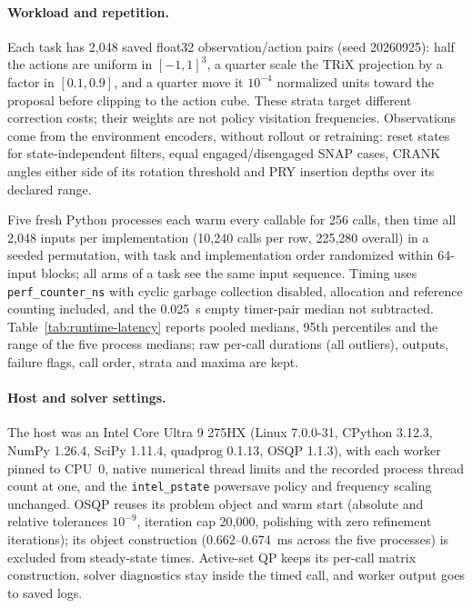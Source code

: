 \documentclass[10pt]{article}
\begin{document}
\paragraph{Workload and repetition.}
Each task has 2,048 saved float32 observation/action pairs (seed 20260925):
half the actions are uniform in $[-1,1]^3$, a quarter scale the TRiX
projection by a factor in $[0.1,0.9]$, and a quarter move it $10^{-4}$
normalized units toward the proposal before clipping to the action cube.
These strata target different correction costs; their weights are not policy
visitation frequencies. Observations come from the environment encoders,
without rollout or retraining: reset states for state-independent filters,
equal engaged/disengaged SNAP cases, CRANK angles either side of its rotation
threshold and PRY insertion depths over its declared range.

Five fresh Python processes each warm every callable for 256 calls, then time
all 2,048 inputs per implementation (10,240 calls per row, 225,280 overall)
in a seeded permutation, with task and implementation order randomized within
64-input blocks; all arms of a task see the same input sequence. Timing uses
\texttt{perf\_counter\_ns} with cyclic garbage collection disabled, allocation
and reference counting included, and the 0.025~\textmu s empty timer-pair median
not subtracted. Table~\ref{tab:runtime-latency} reports pooled medians, 95th
percentiles and the range of the five process medians; raw per-call durations
(all outliers), outputs, failure flags, call order, strata and maxima are kept.

\paragraph{Host and solver settings.}
The host was an Intel Core Ultra 9 275HX (Linux 7.0.0-31, CPython 3.12.3,
NumPy 1.26.4, SciPy 1.11.4, quadprog 0.1.13, OSQP 1.1.3), with each worker
pinned to CPU~0, native numerical thread limits and the recorded process
thread count at one, and the \texttt{intel\_pstate} powersave policy and
frequency scaling unchanged. OSQP
reuses its problem object and warm start (absolute and relative tolerances
$10^{-9}$, iteration cap 20,000, polishing with zero refinement iterations);
its object construction (0.662--0.674~ms across the five processes) is
excluded from steady-state times. Active-set QP keeps its per-call matrix
construction, solver diagnostics stay inside the timed call, and worker
output goes to saved logs.
\end{document}
